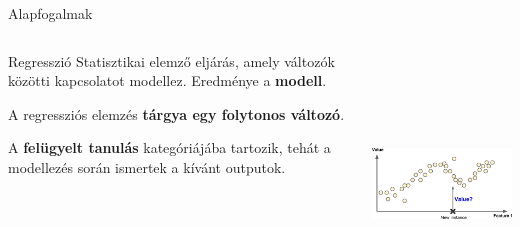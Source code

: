 \documentclass[english, aspectratio=169]{beamer}
\makeatletter
\let\origtableofcontents=\tableofcontents
\def\tableofcontents{\@ifnextchar[{\origtableofcontents}{\gobbletableofcontents}}
\def\gobbletableofcontents#1{\origtableofcontents}
\makeatother
\begin{document}
\begin{frame}
\tableofcontents[currentsection]
\end{frame}

\begin{frame}{Alapfogalmak}
\begin{columns}
\begin{column}{.5\textwidth}
\begin{block}{Regresszió}
Statisztikai elemző eljárás, amely változók közötti kapcsolatot modellez. Eredménye a \textbf{modell}.\par\smallskip
A regressziós elemzés \textbf{tárgya egy folytonos változó}.\par\smallskip
A \textbf{felügyelt tanulás} kategóriájába tartozik, tehát a modellezés során ismertek a kívánt outputok. 
\end{block}
\end{column}
\begin{column}{.5\textwidth}
\begin{center}
\includegraphics[width=7cm, height=7cm, keepaspectratio]{images/regresszio_8.png}
\end{center}
\end{column}
\end{columns}
\end{frame}
\end{document}
